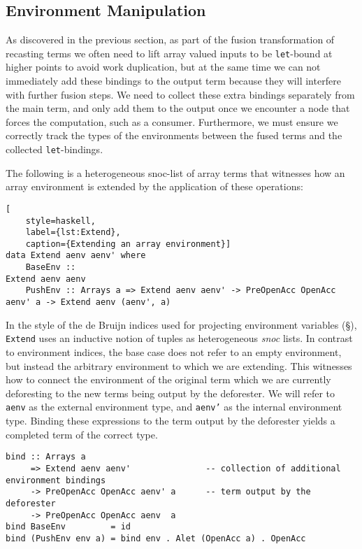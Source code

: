 \subsection{Environment Manipulation}
\label{sec:environment_manipulation}

As discovered in the previous section, as part of the fusion transformation of
recasting terms we often need to lift array valued inputs to be
\texttt{let}-bound at higher points to avoid work duplication, but at the same
time we can not immediately add these bindings to the output term because they
will interfere with further fusion steps. We need to collect these extra
bindings separately from the main term, and only add them to the output once we
encounter a node that forces the computation, such as a consumer. Furthermore,
we must ensure we correctly track the types of the environments between the
fused terms and the collected \texttt{let}-bindings.

The following is a heterogeneous snoc-list of array terms that witnesses how an
array environment is extended by the application of these operations:
%
\begin{lstlisting}[
    style=haskell,
    label={lst:Extend},
    caption={Extending an array environment}]
data Extend aenv aenv' where
    BaseEnv ::                                                                Extend aenv aenv
    PushEnv :: Arrays a => Extend aenv aenv' -> PreOpenAcc OpenAcc aenv' a -> Extend aenv (aenv', a)
\end{lstlisting}
%
In the style of the de Bruijn indices used for projecting environment variables
(\S\derp), \texttt{Extend} uses an inductive notion of tuples as heterogeneous
\emph{snoc} lists. In contrast to environment indices, the base case does not
refer to an empty environment, but instead the arbitrary environment to which we
are extending. This witnesses how to connect the environment of the original
term which we are currently deforesting to the new terms being output by the
deforester. We will refer to \texttt{aenv} as the external environment type, and
\texttt{aenv'} as the internal environment type. Binding these expressions to
the term output by the deforester yields a completed term of the correct type.
%
\begin{lstlisting}[style=haskell]
bind :: Arrays a
     => Extend aenv aenv'               -- collection of additional environment bindings
     -> PreOpenAcc OpenAcc aenv' a      -- term output by the deforester
     -> PreOpenAcc OpenAcc aenv  a
bind BaseEnv         = id
bind (PushEnv env a) = bind env . Alet (OpenAcc a) . OpenAcc
\end{lstlisting}


